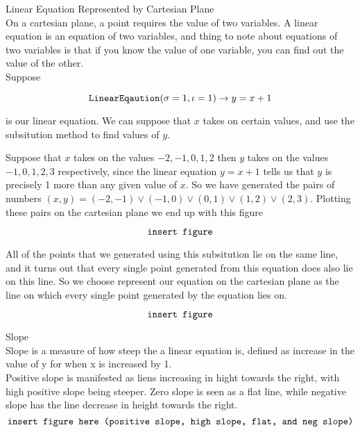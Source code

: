\documentclass{book}
\begin{document}
  {\remark Linear Equation Represented by Cartesian Plane \\
    On a cartesian plane, a point requires the value of two variables. A linear equation is an equation of two variables, and thing to note about equations of two variables is that if you know the value of one variable, you can find out the value of the other.\\

    Suppose

    $$\text{\texttt{LinearEqaution}}(\sigma = 1, \iota = 1) \to y = x + 1$$

    is our linear equation. We can suppose that $x$ takes on certain values, and use the subsitution method to find values of $y$.

    Suppose that $x$ takes on the values $-2, -1, 0, 1, 2$ then $y$ takes on the values $-1, 0, 1, 2, 3$ respectively, since the linear equation $y = x + 1$ tells us that $y$ is precisely 1 more than any given value of $x$. So we have generated the pairs of numbers $(x, y) = (-2, -1) \lor (-1, 0) \lor (0, 1) \lor (1, 2) \lor (2, 3)$. Plotting these pairs on the cartesian plane we end up with this figure

    $$\text{\texttt{insert figure}}$$

    All of the points that we generated using this subsitution lie on the same line, and it turns out that every single point generated from this equation does also lie on this line. So we choose represent our equation on the cartesian plane as the line on which every single point generated by the equation lies on.

    $$\text{\texttt{insert figure}}$$
  }


  {\remark Slope \\
    Slope is a measure of how steep the a linear equation is, defined as increase in the value of y for when x is increased by 1.\\

    Positive slope is manifested as liens increasing in hight towards the right, with high positive slope being steeper. Zero slope is seen as a flat line, while negative slope has the line decrease in height towards the right.\\

    $$\text{\texttt{insert figure here (positive slope, high slope, flat, and neg slope)}}$$
  }
\end{document}
